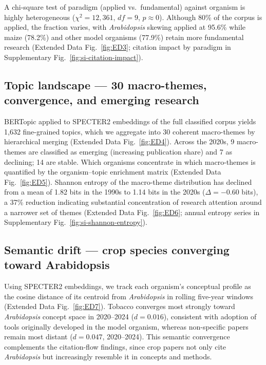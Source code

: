 
A chi-square test of paradigm (applied vs.\ fundamental) against organism is
highly heterogeneous ($\chi^2 = 12{,}361$, $df = 9$, $p \approx 0$). Although 80\%
of the corpus is applied, the fraction varies, with \textit{Arabidopsis} skewing
applied at 95.6\% while maize (78.2\%) and other model organisms (77.9\%) retain
more fundamental research (Extended Data Fig.~\ref{fig:ED3}; citation impact by
paradigm in Supplementary Fig.~\ref{fig:si-citation-impact}).


\subsection*{Topic landscape --- 30 macro-themes, convergence, and emerging research}

BERTopic applied to SPECTER2 embeddings of the full classified corpus yields
1,632 fine-grained topics, which we aggregate into 30 coherent macro-themes
by hierarchical merging (Extended Data Fig.~\ref{fig:ED4}).
Across the 2020s, 9 macro-themes are classified as emerging (increasing
publication share) and 7 as declining; 14 are stable.
Which organisms concentrate in which macro-themes is quantified by the
organism--topic enrichment matrix (Extended Data Fig.~\ref{fig:ED5}).
Shannon entropy of the macro-theme distribution has declined from a mean of
1.82 bits in the 1990s to 1.14 bits in the 2020s ($\Delta = -0.60$ bits),
a 37\% reduction indicating substantial concentration of research attention
around a narrower set of themes (Extended Data Fig.~\ref{fig:ED6}; annual
entropy series in Supplementary Fig.~\ref{fig:si-shannon-entropy}).




\subsection*{Semantic drift --- crop species converging toward Arabidopsis}

Using SPECTER2 embeddings, we track each organism's conceptual profile as the
cosine distance of its centroid from \textit{Arabidopsis} in rolling five-year
windows (Extended Data Fig.~\ref{fig:ED7}). Tobacco converges most strongly
toward \textit{Arabidopsis} concept space in 2020--2024 ($d = 0.016$),
consistent with adoption of tools originally developed in the model organism, whereas
non-specific papers remain most distant ($d = 0.047$, 2020--2024). This semantic
convergence complements the citation-flow findings, since crop papers not only
cite \textit{Arabidopsis} but increasingly resemble it in concepts and methods.

